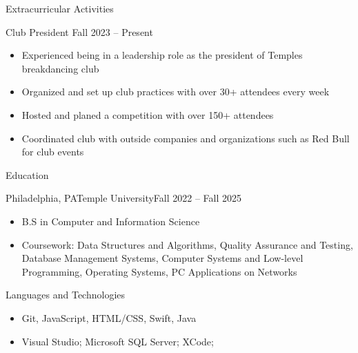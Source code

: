 \documentclass[]{mcdowellcv}
\begin{document}
	
	

	

	
	\begin{cvsection}{Extracurricular Activities}
		\begin{cvsubsection}{Club President}{}{ Fall 2023 -- Present}	
			\begin{itemize}
				\item Experienced being in a leadership role as the president of Temples breakdancing club
				\item Organized and set up club practices with over 30+ attendees every week
				\item Hosted and planed a competition with over 150+ attendees
				\item Coordinated club with outside companies and organizations such as Red Bull for club events
			\end{itemize}
		\end{cvsubsection}
	\end{cvsection}

	\begin{cvsection}{Education}
		\begin{cvsubsection}{Philadelphia, PA}{Temple University}{Fall 2022 -- Fall 2025}
			\begin{itemize}
				\item B.S in Computer and Information Science
				\item Coursework: Data Structures and Algorithms, Quality Assurance and Testing, Database Management Systems, Computer Systems and Low-level Programming, Operating Systems, PC Applications on Networks
			\end{itemize}
		\end{cvsubsection}
	\end{cvsection}
	
	\begin{cvsection}{Languages and Technologies}
		\begin{cvsubsection}{}{}{}	
			\begin{itemize}
				\item Git, JavaScript, HTML/CSS, Swift, Java
				\item Visual Studio; Microsoft SQL Server; XCode; 
			\end{itemize}
		\end{cvsubsection}
	\end{cvsection}
	
\end{document}
